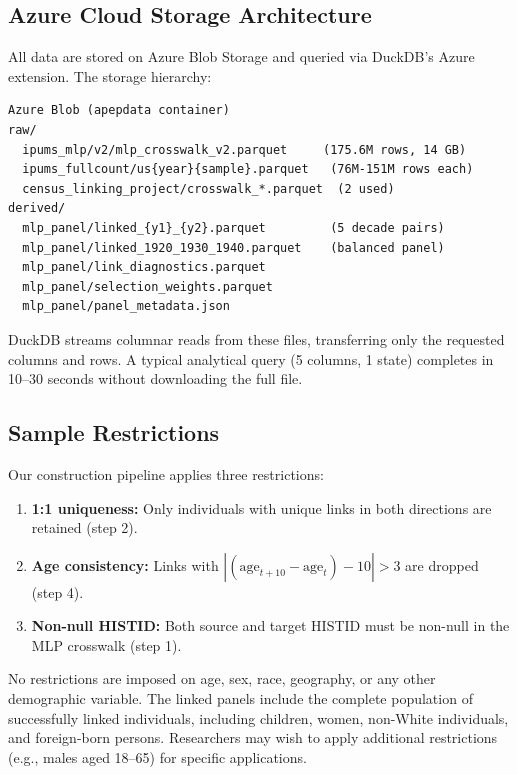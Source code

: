\documentclass[12pt]{article}
\begin{document}
\subsection{Azure Cloud Storage Architecture}

All data are stored on Azure Blob Storage and queried via DuckDB's Azure extension. The storage hierarchy:

\begin{verbatim}
Azure Blob (apepdata container)
raw/
  ipums_mlp/v2/mlp_crosswalk_v2.parquet     (175.6M rows, 14 GB)
  ipums_fullcount/us{year}{sample}.parquet   (76M-151M rows each)
  census_linking_project/crosswalk_*.parquet  (2 used)
derived/
  mlp_panel/linked_{y1}_{y2}.parquet         (5 decade pairs)
  mlp_panel/linked_1920_1930_1940.parquet    (balanced panel)
  mlp_panel/link_diagnostics.parquet
  mlp_panel/selection_weights.parquet
  mlp_panel/panel_metadata.json
\end{verbatim}

DuckDB streams columnar reads from these files, transferring only the requested columns and rows. A typical analytical query (5 columns, 1 state) completes in 10--30 seconds without downloading the full file.

\subsection{Sample Restrictions}

Our construction pipeline applies three restrictions:
\begin{enumerate}
\item \textbf{1:1 uniqueness:} Only individuals with unique links in both directions are retained (step 2).
\item \textbf{Age consistency:} Links with $|(\text{age}_{t+10} - \text{age}_t) - 10| > 3$ are dropped (step 4).
\item \textbf{Non-null HISTID:} Both source and target HISTID must be non-null in the MLP crosswalk (step 1).
\end{enumerate}

No restrictions are imposed on age, sex, race, geography, or any other demographic variable. The linked panels include the complete population of successfully linked individuals, including children, women, non-White individuals, and foreign-born persons. Researchers may wish to apply additional restrictions (e.g., males aged 18--65) for specific applications.


\end{document}
